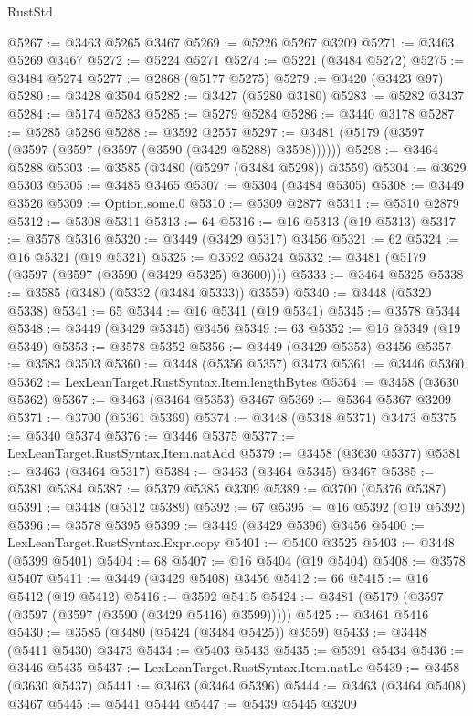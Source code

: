 \begin{lexlean}{RustStd}
\begin{coremodule}
{\begin{coremodule}
{{{{{{{{{{{{{{{{{{{{{{{{{{{{{{{{{{{{{{{{{{{{{{{{{{{{{{{{{{{{{{{{{{{{{{{{{{{{{{{{{{{{{@5267 := @3463 @5265 @3467
@5269 := @5226 @5267 @3209
@5271 := @3463 @5269 @3467
@5272 := @5224 @5271
@5274 := @5221 (@3484 @5272)
@5275 := @3484 @5274
@5277 := @2868 (@5177 @5275)
@5279 := @3420 (@3423 @97)
@5280 := @3428 @3504
@5282 := @3427 (@5280 @3180)
@5283 := @5282 @3437
@5284 := @5174 @5283
@5285 := @5279 @5284
@5286 := @3440 @3178
@5287 := @5285 @5286
@5288 := @3592 @2557
@5297 := @3481 (@5179 (@3597 (@3597 (@3597 (@3597 (@3590 (@3429 @5288) @3598))))))
@5298 := @3464 @5288
@5303 := @3585 (@3480 (@5297 (@3484 @5298)) @3559)
@5304 := @3629 @5303
@5305 := @3485 @3465
@5307 := @5304 (@3484 @5305)
@5308 := @3449 @3526
@5309 := Option.some.{0}
@5310 := @5309 @2877
@5311 := @5310 @2879
@5312 := @5308 @5311
@5313 := 64
@5316 := @16 @5313 (@19 @5313)
@5317 := @3578 @5316
@5320 := @3449 (@3429 @5317) @3456
@5321 := 62
@5324 := @16 @5321 (@19 @5321)
@5325 := @3592 @5324
@5332 := @3481 (@5179 (@3597 (@3597 (@3590 (@3429 @5325) @3600))))
@5333 := @3464 @5325
@5338 := @3585 (@3480 (@5332 (@3484 @5333)) @3559)
@5340 := @3448 (@5320 @5338)
@5341 := 65
@5344 := @16 @5341 (@19 @5341)
@5345 := @3578 @5344
@5348 := @3449 (@3429 @5345) @3456
@5349 := 63
@5352 := @16 @5349 (@19 @5349)
@5353 := @3578 @5352
@5356 := @3449 (@3429 @5353) @3456
@5357 := @3583 @3503
@5360 := @3448 (@5356 @5357) @3473
@5361 := @3446 @5360
@5362 := LexLeanTarget.RustSyntax.Item.lengthBytes
@5364 := @3458 (@3630 @5362)
@5367 := @3463 (@3464 @5353) @3467
@5369 := @5364 @5367 @3209
@5371 := @3700 (@5361 @5369)
@5374 := @3448 (@5348 @5371) @3473
@5375 := @5340 @5374
@5376 := @3446 @5375
@5377 := LexLeanTarget.RustSyntax.Item.natAdd
@5379 := @3458 (@3630 @5377)
@5381 := @3463 (@3464 @5317)
@5384 := @3463 (@3464 @5345) @3467
@5385 := @5381 @5384
@5387 := @5379 @5385 @3309
@5389 := @3700 (@5376 @5387)
@5391 := @3448 (@5312 @5389)
@5392 := 67
@5395 := @16 @5392 (@19 @5392)
@5396 := @3578 @5395
@5399 := @3449 (@3429 @5396) @3456
@5400 := LexLeanTarget.RustSyntax.Expr.copy
@5401 := @5400 @3525
@5403 := @3448 (@5399 @5401)
@5404 := 68
@5407 := @16 @5404 (@19 @5404)
@5408 := @3578 @5407
@5411 := @3449 (@3429 @5408) @3456
@5412 := 66
@5415 := @16 @5412 (@19 @5412)
@5416 := @3592 @5415
@5424 := @3481 (@5179 (@3597 (@3597 (@3597 (@3590 (@3429 @5416) @3599)))))
@5425 := @3464 @5416
@5430 := @3585 (@3480 (@5424 (@3484 @5425)) @3559)
@5433 := @3448 (@5411 @5430) @3473
@5434 := @5403 @5433
@5435 := @5391 @5434
@5436 := @3446 @5435
@5437 := LexLeanTarget.RustSyntax.Item.natLe
@5439 := @3458 (@3630 @5437)
@5441 := @3463 (@3464 @5396)
@5444 := @3463 (@3464 @5408) @3467
@5445 := @5441 @5444
@5447 := @5439 @5445 @3209
}}}}}}}}}}}}}}}}}}}}}}}}}}}}}}}}}}}}}}}}}}}}}}}}}}}}}}}}}}}}}}}}}}}}}}}}}}}}}}}}}}}}}
\end{coremodule}}
\end{coremodule}
\end{lexlean}
